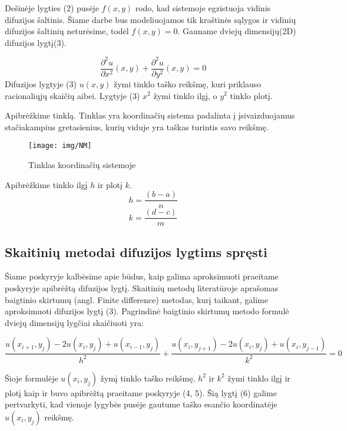 \documentclass{VUMIFPSkursinis}
\begin{document}
Dešinėje lygties (2) pusėje $f(x,y)$ rodo, kad sistemoje egzistuoja vidinis difuzijos šaltinis.
Šiame darbe bus modeliuojamos tik kraštinės sąlygos ir vidinių difuzijos šaltinių neturėsime, todėl $f(x,y) = 0$.
Gauname dviejų dimensijų(2D) difuzijos lygtį(3).

\begin{equation}
\frac{\partial^{2} u}{\partial x^{2}} (x, y) + \frac{\partial^{2} u}{\partial y^{2}} (x, y) = 0
\end{equation}
Difuzijos lygtyje (3) $u(x,y)$ žymi tinklo taško reikšmę, kuri priklauso racionaliųjų skaičių aibei.
Lygtyje (3) $x^2$ žymi tinklo ilgį, o $y^2$ tinklo plotį.

Apibrėžkime tinklą.
Tinklas yra koordinačių sistema padalinta į įsivaizduojamus stačiakampius gretasienius, kurių viduje yra taškas turintis savo reikšmę.

\begin{figure}[H]
\centering
\texttt{[image: img/NM]}
\caption{Tinklas koordinačių sistemoje} %
\label{img:text}
\end{figure}

Apibrėžkime tinklo ilgį $h$ ir plotį $k$.
\begin{equation}
h = \frac{(b - a)}{n}
\end{equation}
\begin{equation}
k = \frac{(d - c)}{m}
\end{equation}
\subsection{Skaitinių metodai difuzijos lygtims spręsti}
Šiame poskyryje kalbėsime apie būdus, kaip galima aproksimuoti praeitame poskyryje apibrėžtą difuzijos lygtį.
Skaitinių metodų literatūroje \cite{NumAnal} aprašomas baigtinio skirtumų (angl. Finite difference) metodas, kurį taikant, galime aproksimuoti difuzijos lygtį (3).
Pagrindinė baigtinio skirtumų metodo formulė dviejų dimensijų lygčiai skaičiuoti yra:

\begin{equation}
\frac{u(x_{ i + 1} , y_j) - 2u(x_{ i } , y_j) + u(x_{ i - 1} , y_j)}{h^{2}} + \frac{u(x_{ i } , y_{ j + 1}) - 2u(x_{ i } , y_j) + u(x_{ i } , y_{j - 1})}{k^{2}} = 0
\end{equation}

Šioje formulėje $u(x_i,y_j)$ žymį tinklo taško reikšmę.
$h^2$ ir $k^2$ žymi tinklo ilgį ir plotį kaip ir buvo apibrėžtą praeitame poskyryje (4, 5).
Šią lygtį (6) galime pertvarkyti, kad vienoje lygybės pusėje gautume taško esančio koordinatėje $u(x_i , y_j)$ reikšmę.
\end{document}
